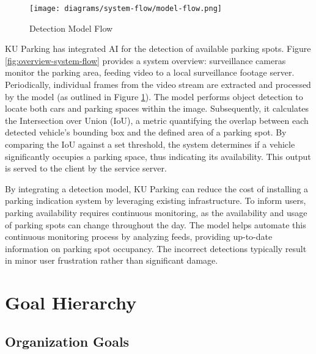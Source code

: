 \begin{figure}[H]
    \centering
    \texttt{[image: diagrams/system-flow/model-flow.png]}
    \caption{Detection Model Flow}
    \label{fig:model-flow}
\end{figure}


KU Parking has integrated AI for the detection of available parking spots. Figure \ref{fig:overview-system-flow} provides a system overview: surveillance cameras monitor the parking area, feeding video to a local surveillance footage server. Periodically, individual frames from the video stream are extracted and processed by the model (as outlined in Figure \ref{fig:model-flow}). The model performs object detection to locate both cars and parking spaces within the image. Subsequently, it calculates the Intersection over Union (IoU), a metric quantifying the overlap between each detected vehicle's bounding box and the defined area of a parking spot. By comparing the IoU against a set threshold, the system determines if a vehicle significantly occupies a parking space, thus indicating its availability. This output is served to the client by the service server.

By integrating a detection model, KU Parking can reduce the cost of installing a parking indication system by leveraging existing infrastructure. To inform users, parking availability requires continuous monitoring, as the availability and usage of parking spots can change throughout the day. The model helps automate this continuous monitoring process by analyzing feeds, providing up-to-date information on parking spot occupancy. The incorrect detections typically result in minor user frustration rather than significant damage.

\section{Goal Hierarchy}
\label{section:goal-hierarchy}

\subsection{Organization Goals}
\label{subsection:organization-goal}

